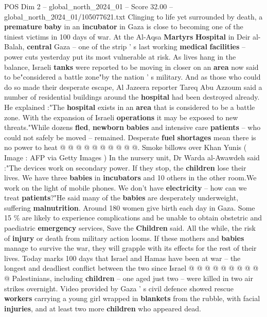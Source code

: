 \begin{textsample}{POS Dim 2 – global\_north\_2024\_01 – Score 32.00 – global\_north\_2024\_01/105077621.txt}  \label{ex:f2_pos_205}
Clinging to life yet surrounded by death, a \textbf{premature} \textbf{baby} in an \textbf{incubator} in Gaza is close to becoming one of the tiniest victims in 100 days of war.
At the Al-Aqsa \textbf{Martyrs} \textbf{Hospital} in Deir al-Balah, \textbf{central} Gaza -- one of the strip ' s last working \textbf{medical} \textbf{facilities} -- power cuts yesterday put its most vulnerable at risk.
As lives hang in the balance, Israeli \textbf{tanks} were reported to be moving in closer on an \textbf{area} now said to be"considered a battle zone"by the nation ' s military.
And as those who could do so made their desperate escape, Al Jazeera reporter Tareq Abu Azzoum said a number of residential buildings around the \textbf{hospital} had been destroyed already.
He explained :"The \textbf{hospital} exists in an \textbf{area} that is considered to be a battle zone.
With the expansion of Israeli \textbf{operations} it may be exposed to new threats."While dozens \textbf{fled}, \textbf{newborn} \textbf{babies} and intensive care \textbf{patients} -- who could not safely be moved -- remained.
Desperate \textbf{fuel} \textbf{shortages} mean there is no power to heat @ @ @ @ @ @ @ @ @ @.
Smoke billows over Khan Yunis ( Image : AFP via Getty Images ) In the nursery unit, Dr Warda al-Awawdeh said :"The devices work on secondary power.
If they stop, the \textbf{children} lose their lives.
We have three \textbf{babies} in \textbf{incubators} and 10 others in the other room.We work on the light of mobile phones.
We don't have \textbf{electricity} -- how can we treat \textbf{patients}?"He said many of the \textbf{babies} are desperately underweight, suffering \textbf{malnutrition}.
Around 180 women give birth each day in Gaza.
Some 15 \% are likely to experience complications and be unable to obtain obstetric and paediatric \textbf{emergency} services, Save the \textbf{Children} said.
All the while, the risk of \textbf{injury} or death from military action looms.
If these mothers and \textbf{babies} manage to survive the war, they will grapple with its effects for the rest of their lives.
Today marks 100 days that Israel and Hamas have been at war -- the longest and deadliest conflict between the two since Israel @ @ @ @ @ @ @ @ @ @ Palestinians, including \textbf{children} -- one aged just two -- were killed in two air strikes overnight.
Video provided by Gaza ' s civil defence showed rescue \textbf{workers} carrying a young girl wrapped in \textbf{blankets} from the rubble, with facial \textbf{injuries}, and at least two more \textbf{children} who appeared dead.

\end{textsample}

